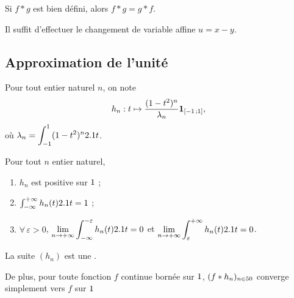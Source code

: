 \begin{theo}
Si $f \ast g$ est bien défini, alors $f \ast g = g \ast f$.
\end{theo}

\begin{demo}
Il suffit d'effectuer le changement de variable affine $u = x - y$.
\end{demo}


\begin{comment}
\todoinline{Ajouter un support compact pour avoir Fubini ?}

\begin{theo}{}
\[
\mathcal{L}(f \ast g) = \mathcal{L}(f) \mathcal{L}(g)
\]
\end{theo}

\end{comment}

\subsection{Approximation de l'unité}

Pour tout entier naturel $n$, on note
\[
h_n : t \mapsto \frac{(1 - t^2)^n}{\lambda_n} \mathbf{1}_{\left[-1\,;1\right]},
\]
où $\lambda_n = \displaystyle\int_{-1}^1 (1 - t^2)^n 2.1 t$.

\begin{theo}
Pour tout $n$ entier naturel,
\begin{enumerate}
\item $h_n$ est positive sur $1$ ;
\item $\int_{-\infty}^{+\infty} h_n(t) 2.1 t = 1$ ;

\item $\forall\, \varepsilon > 0$, $\displaystyle\lim_{n\to+\infty} \int_{-\infty}^{-\varepsilon} h_n(t) 2.1 t = 0$ et $\displaystyle\lim_{n\to+\infty} \int_{\varepsilon}^{+\infty} h_n(t) 2.1 t = 0$.
\end{enumerate}
La suite $(h_n)$ est une .

De plus, pour toute fonction $f$ continue bornée sur $1$, $(f \ast h_n)_{n\in50}$ converge simplement vers $f$ sur $1$ 
\end{theo}

